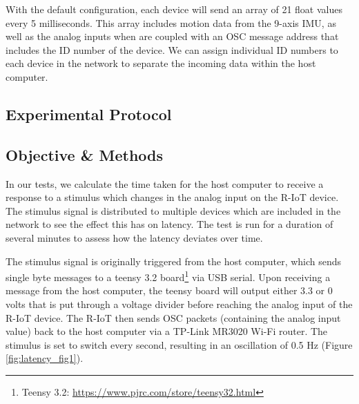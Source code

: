 With the default configuration, each device will send an array of 21 float values every 5 milliseconds. This array includes motion data from the 9-axis IMU, as well as the analog inputs when are coupled with an OSC message address that includes the ID number of the device. We can assign individual ID numbers to each device in the network to separate the incoming data within the host computer.

\subsection{Experimental Protocol}

\subsection{Objective \& Methods}
In our tests, we calculate the time taken for the host computer to receive a response to a stimulus which changes in the analog input on the R-IoT device. The stimulus signal is distributed to multiple devices which are included in the network to see the effect this has on latency. The test is run for a duration of several minutes to assess how the latency deviates over time.

The stimulus signal is originally triggered from the host computer, which sends single byte messages to a teensy 3.2 board\footnote{Teensy 3.2: \url{https://www.pjrc.com/store/teensy32.html}} via USB serial. Upon receiving a message from the host computer, the teensy board will output either 3.3 or 0 volts that is put through a voltage divider before reaching the analog input of the R-IoT device. The R-IoT then sends OSC packets (containing the analog input value) back to the host computer via a TP-Link MR3020 Wi-Fi router. The stimulus is set to switch every second, resulting in an oscillation of 0.5 Hz (Figure \ref{fig:latency_fig1}).

